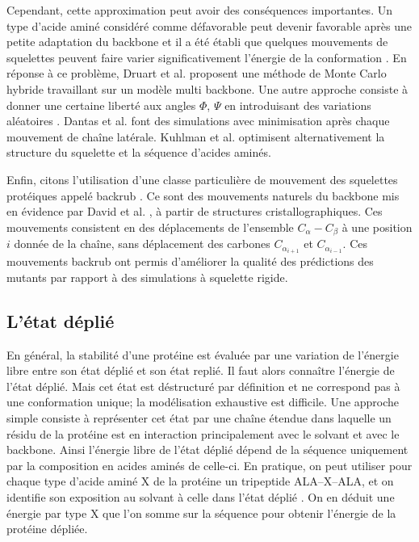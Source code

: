 Cependant, cette approximation peut avoir des conséquences importantes. Un type d'acide aminé considéré comme défavorable peut devenir favorable après une petite adaptation du backbone et il a été établi que quelques mouvements de squelettes peuvent faire varier significativement l'énergie de la conformation \cite{Desjarlais99}.
En réponse à ce problème, Druart et al. \cite{Druart16} proposent une méthode de Monte Carlo hybride travaillant sur un modèle multi backbone. Une autre approche consiste à donner une certaine liberté aux angles $\Phi$, $\Psi$ en introduisant des variations aléatoires \cite{Desjarlais99}. Dantas et al. \cite{Dantas07} font des simulations avec minimisation après chaque mouvement de chaîne latérale. Kuhlman et al. \cite{Kuhlman03}  optimisent alternativement la structure du squelette et la séquence d'acides aminés.

Enfin, citons l'utilisation d'une classe particulière de mouvement des squelettes protéiques appelé \og backrub \fg. Ce sont des mouvements naturels du backbone mis en évidence par David et al. \cite{Davis06}, à partir de structures cristallographiques. Ces mouvements consistent en des déplacements de l'ensemble $C_{\alpha}-C_{\beta}$ à une position $i$ donnée de la chaîne, sans déplacement des carbones $C_{\alpha_{i+1}}$ et $C_{\alpha_{i-1}}$. Ces mouvements backrub ont permis \cite{Georgiev08,Smith08} d'améliorer la qualité des prédictions des mutants par rapport à des simulations à squelette rigide.

\subsection{L'état déplié }
\label{sub:deplie}
En général, la stabilité d'une protéine est évaluée par une variation de l'énergie libre entre son état déplié et son état replié. Il faut alors connaître l'énergie de l'état déplié. Mais cet état est déstructuré par définition et ne correspond pas à une conformation unique; la modélisation exhaustive est difficile. Une approche simple consiste à représenter cet état par une chaîne étendue dans laquelle un résidu de la protéine est en interaction principalement avec le solvant et avec le backbone. Ainsi l'énergie libre de l'état déplié dépend de la séquence uniquement par la composition en acides aminés de celle-ci. En pratique, on peut utiliser pour chaque type d'acide aminé X de la protéine  un tripeptide ALA--X--ALA, et on identifie son exposition au solvant à celle dans l'état déplié \cite{Dahiyat96}. On en déduit une énergie par type X que l'on somme sur la séquence pour obtenir l'énergie de la protéine dépliée. 

